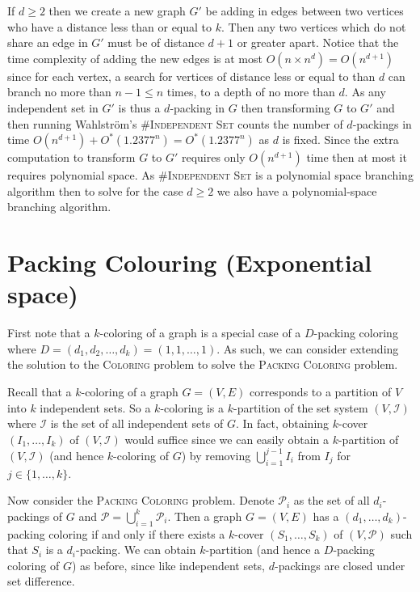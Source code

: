 \documentclass[10pt, a4paper]{article}
\theoremstyle{definition}
\newcommand{\mcP}{\mathcal{P}}
\newcommand{\mcI}{\mathcal{I}}
\begin{document}
If $d \geq 2$ then we create a new graph $G'$ be adding in edges between two vertices who have a distance less than or equal to $k$. Then any two vertices which do not share an edge in $G'$ must be of distance $d+1$ or greater apart. Notice that the time complexity of adding the new edges is at most $O(n \times n^d) = O(n^{d+1})$ since for each vertex, a search for vertices of distance less or equal to than $d$ can branch no more than $n-1 \leq n$ times, to a depth of no more than $d$. As any independent set in $G'$ is thus a $d$-packing in $G$ then transforming $G$ to $G'$ and then running Wahlstr\"{o}m's \#\textsc{Independent Set} counts the number of $d$-packings in time $O(n^{d+1}) + O^*(1.2377^n) = O^*(1.2377^n)$ as $d$ is fixed. Since the extra computation to transform $G$ to $G'$ requires only $O(n^{d+1})$ time then at most it requires polynomial space. As \#\textsc{Independent Set} is a polynomial space branching algorithm then to solve for the case $d \geq 2$ we also have a polynomial-space branching algorithm.

\section{\sc Packing Colouring  (\textnormal{Exponential space})}


First note that a $k$-coloring of a graph is a special case of a $D$-packing coloring 
where $D = (d_1, d_2, \dotsc, d_k) = (1, 1, \dotsc, 1)$. As such, we can consider extending
the solution to the \textsc{Coloring} problem to solve the \textsc{Packing Coloring} problem.

Recall that a $k$-coloring of a graph $G = (V, E)$ corresponds to a partition of $V$ into $k$ independent sets. So a $k$-coloring is a $k$-partition of the set system $(V, \mcI)$ where $\mcI$ is the set of all independent sets of $G$. In fact, obtaining $k$-cover $(I_1, \dotsc, I_k)$ of $(V, \mcI)$ would suffice since we can easily obtain a $k$-partition of $(V, \mcI)$ (and hence $k$-coloring of $G$) by removing $\bigcup_{i=1}^{j-1} I_i$ from $I_j$ for $j \in \{1, \dotsc, k\}$.

Now consider the \textsc{Packing Coloring} problem. Denote $\mcP_i$ as the set of all $d_i$-packings of $G$ and $\mcP = \bigcup_{i=1}^{k} \mcP_i$. Then a graph $G = (V, E)$ has a $(d_1, \dotsc, d_k)$-packing coloring if and only if there exists a $k$-cover $(S_1, \dotsc, S_k)$ of $(V, \mcP)$ such that $S_i$ is a $d_i$-packing. We can obtain $k$-partition (and hence a $D$-packing coloring of $G$) as before, since like independent sets, $d$-packings are closed under set difference.
\end{document}
